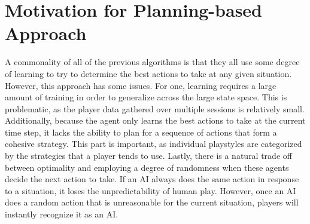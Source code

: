 \chapter{Motivation for Planning-based Approach}

\label{Chapter3} %

A commonality of all of the previous algorithms is that they all use some degree of learning to try to determine the best actions to take at any given situation. However, this approach has some issues. For one, learning requires a large amount of training in order to generalize across the large state space. This is problematic, as the player data gathered over multiple sessions is relatively small. Additionally, because the agent only learns the best actions to take at the current time step, it lacks the ability to plan for a sequence of actions that form a cohesive strategy. This part is important, as individual playstyles are categorized by the strategies that a player tends to use. Lastly, there is a natural trade off between optimality and employing a degree of randomness when these agents decide the next action to take. If an AI always does the same action in response to a situation, it loses the unpredictability of human play. However, once an AI does a random action that is unreasonable for the current situation, players will instantly recognize it as an AI. 

